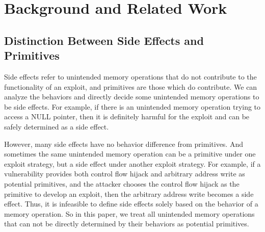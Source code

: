 \section{Background and Related Work}











\iffalse
\subsection{Distinction Between Side Effects and Primitives}
Side effects refer to unintended memory operations that do not contribute to the functionality of an exploit, and primitives are those which do contribute. 
We can analyze the behaviors and directly decide some unintended memory operations to be side effects. For example, if there is an unintended memory operation trying to access a NULL pointer, then it is definitely harmful for the exploit and can be safely determined as a side effect. 

However, many side effects have no behavior difference from primitives. And sometimes the same unintended memory operation can be a primitive under one exploit strategy, but a side effect under another exploit strategy. 
For example, if a vulnerability provides both control flow hijack and arbitrary address write as potential primitives, and the attacker chooses the control flow hijack as the primitive to develop an exploit, then the arbitrary address write becomes a side effect. Thus, it is infeasible to define side effects solely based on the behavior of a memory operation. So in this paper, we treat all unintended memory operations that can not be directly determined by their behaviors as potential primitives. 

